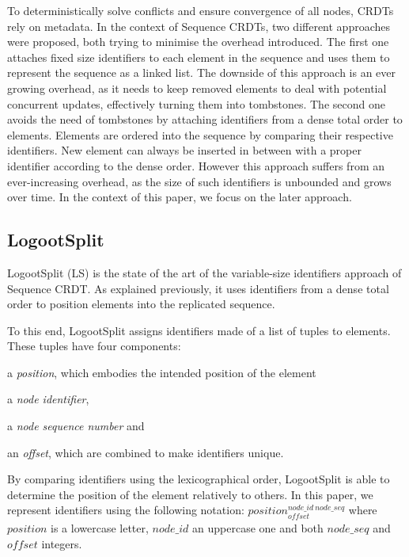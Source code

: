\documentclass[10pt,journal,compsoc]{IEEEtran}
\newcommand{\trm}[1]{\mathit{#1}}
\newcommand{\id}[3]{$\trm{#1}^{\trm{#2}}_{\trm{#3}}$}
\begin{document}
To deterministically solve conflicts and ensure convergence of all nodes, \acp{CRDT} rely on metadata.
In the context of Sequence \acp{CRDT}, two different approaches were proposed, both trying to minimise the overhead introduced.
The first one \cite{oster:inria-00108523, Weiss_2007, ahmednacer:inria-00629503, ROH2011354, briot:hal-01343941} attaches fixed size identifiers to each element in the sequence and uses them to represent the sequence as a linked list.
The downside of this approach is an ever growing overhead, as it needs to keep removed elements to deal with potential concurrent updates, effectively turning them into tombstones.
The second one \cite{5158449,WeissICDCS09,weiss:hal-00450416,AndreCollaborateCom2013,lseq2013,lseq2017} avoids the need of tombstones by attaching identifiers from a dense total order to elements.
Elements are ordered into the sequence by comparing their respective identifiers.
New element can always be inserted in between with a proper identifier according to the dense order.
However this approach suffers from an ever-increasing overhead, as the size of such identifiers is unbounded and grows over time.
In the context of this paper, we focus on the later approach.


\subsection{LogootSplit}

LogootSplit (LS) \cite{AndreCollaborateCom2013} is the state of the art of the variable-size identifiers approach of Sequence \ac{CRDT}.
As explained previously, it uses identifiers from a dense total order to position elements into the replicated sequence.

To this end, LogootSplit assigns identifiers made of a list of tuples to elements.
These tuples have four components:
\begin{enumerate*}
    \item a \emph{position}, which embodies the intended position of the element
    \item a \emph{node identifier},
    \item a \emph{node sequence number} and
    \item an \emph{offset}, which are combined to make identifiers unique.
\end{enumerate*}
By comparing identifiers using the lexicographical order, LogootSplit is able to determine the position of the element relatively to others.
In this paper, we represent identifiers using the following notation: \id{position}{node\_id~node\_seq}{offset} where $\trm{position}$ is a lowercase letter, $\trm{node\_id}$ an uppercase one and both $\trm{node\_seq}$ and $\trm{offset}$ integers.
\end{document}
